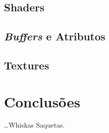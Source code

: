 \subsection{Shaders}


\subsection{\emph{Buffers} e Atributos}


\subsection{Textures}


\section{Conclusões}
\label{sec::arte:conc}

\ldots Whiskas Saquetas.

